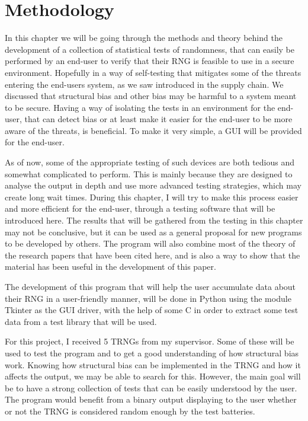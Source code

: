 \documentclass[]{final_report}
\begin{document}
\chapter*{Methodology}

\par{In this chapter we will be going through the methods and theory behind the development of a collection of statistical tests of randomness, that can easily be performed by an end-user to verify that their RNG is feasible to use in a secure environment. Hopefully in a way of self-testing that mitigates some of the threats entering the end-users system, as we saw introduced in the supply chain. We discussed that structural bias and other bias may be harmful to a system meant to be secure. Having a way of isolating the tests in an environment for the end-user, that can detect bias or at least make it easier for the end-user to be more aware of the threats, is beneficial. To make it very simple, a GUI will be provided for the end-user.}

\par{As of now, some of the appropriate testing of such devices are both tedious and somewhat complicated to perform. This is mainly because they are designed to analyse the output in depth and use more advanced testing strategies, which may create long wait times. During this chapter, I will try to make this process easier and more efficient for the end-user, through a testing software that will be introduced here. The results that will be gathered from the testing in this chapter may not be conclusive, but it can be used as a general proposal for new programs to be developed by others. The program will also combine most of the theory of the research papers that have been cited here, and is also a way to show that the material has been useful in the development of this paper.}

\par{The development of this program that will help the user accumulate data about their RNG in a user-friendly manner, will be done in Python using the module Tkinter as the GUI driver, with the help of some C in order to extract some test data from a test library that will be used.}

\par{For this project, I received 5 TRNGs from my supervisor. Some of these will be used to test the program and to get a good understanding of how structural bias work. Knowing how structural bias can be implemented in the TRNG and how it affects the output, we may be able to search for this. However, the main goal will be to have a strong collection of tests that can be easily understood by the user. The program would benefit from a binary output displaying to the user whether or not the TRNG is considered random enough by the test batteries.}
\end{document}
